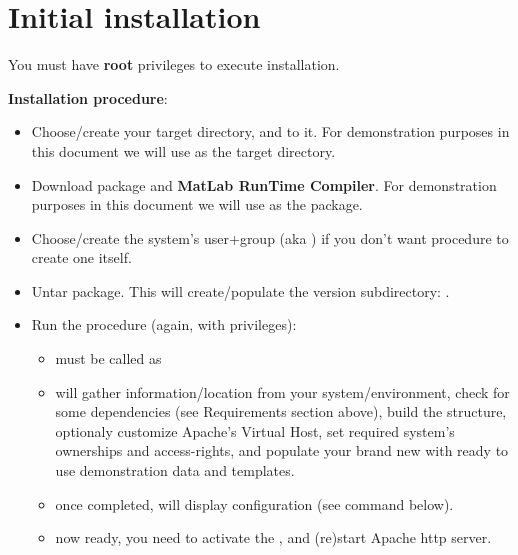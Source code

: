 \section{Initial installation}

You must have \textbf{root} privileges to execute \webobs installation. 

\textbf{Installation procedure}:

\begin{itemize}
\item   Choose/create your target \webobs directory, and  to it. For
demonstration purposes in this document we will use  as the target \webobs directory. 
\item   Download \webobs package and \textbf{MatLab RunTime Compiler}. For
demonstration purposes in this document we will use  as the \webobs package. 
\item   Choose/create the system's \webobs user+group (aka ) if you don't want  procedure
to create one itself.


\item   Untar \webobs package. This will create/populate the \webobs version subdirectory: 
.
\item   Run the  procedure (again, with  privileges):
\begin{itemize}
\item   must be called as 
\item   {} will gather information/location from your system/environment,
check for some dependencies (see Requirements section above), build the \webobs
structure, optionaly customize Apache's \webobs Virtual Host, set required system's
ownerships and access-rights, and populate your brand new \webobs with 
ready to use demonstration data and templates.
\item   once completed,  will display \webobs configuration (see  command below).
\item   \webobs now ready, you need to activate the ,  and (re)start Apache http server. 
\end{itemize}
\end{itemize}

